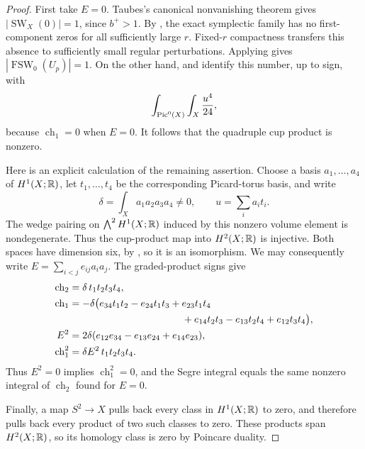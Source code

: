 \begin{proof}
First take \(E=0\).  Taubes's canonical nonvanishing theorem
\cite{Taubes1994} gives
\(|\operatorname{SW}_X(0)|=1\), since \(b^+>1\).
By , the exact symplectic
family has no first-component zeros for all sufficiently large
\(r\).  Fixed-\(r\) compactness transfers this absence to
sufficiently small regular perturbations.  Applying
 gives
\(|\operatorname{FSW}_0(U_p)|=1\).  On the other hand,
 and
 identify
this number, up to sign, with
\[
 \int_{\operatorname{Pic}^0(X)}\int_X\frac{u^4}{24},
\]
because \(\operatorname{ch}_1=0\) when \(E=0\).
It follows that the quadruple cup product is nonzero.

Here is an explicit calculation of the remaining assertion.  Choose
a basis \(a_1,\ldots,a_4\) of \(H^1(X;\mathbb R)\), let
\(t_1,\ldots,t_4\) be the corresponding Picard-torus basis, and
write
\[
 \delta=\int_Xa_1a_2a_3a_4\ne0,
 \qquad u=\sum_i a_it_i.
\]
The wedge pairing on \(\bigwedge^2H^1(X;\mathbb R)\) induced by this
nonzero volume element is nondegenerate.  Thus the cup-product map
into \(H^2(X;\mathbb R)\) is injective.  Both spaces have dimension
six, by , so it is an isomorphism.
We may consequently write
\(E=\sum_{i<j}e_{ij}a_ia_j\).  The graded-product signs give
\begin{align}
 \label{eq:families-exterior-calculation}
 \operatorname{ch}_2&=\delta\,t_1t_2t_3t_4,\\
 \operatorname{ch}_1&=-\delta\bigl(
 e_{34}t_1t_2-e_{24}t_1t_3+e_{23}t_1t_4\notag\\
 &\hspace{40mm}
 +e_{14}t_2t_3-e_{13}t_2t_4+e_{12}t_3t_4\bigr),\notag\\
 E^2&=2\delta(e_{12}e_{34}-e_{13}e_{24}+e_{14}e_{23}),\notag\\
 \operatorname{ch}_1^2&=\delta E^2\,t_1t_2t_3t_4.\notag
\end{align}
Thus \(E^2=0\) implies \(\operatorname{ch}_1^2=0\), and
the Segre integral equals the same nonzero integral of
\(\operatorname{ch}_2\) found for \(E=0\).

Finally, a map \(S^2\to X\) pulls back every class in
\(H^1(X;\mathbb R)\) to zero, and therefore pulls back every product
of two such classes to zero.  These products span \(H^2(X;\mathbb R)\),
so its homology class is zero by Poincare duality.
\end{proof}

